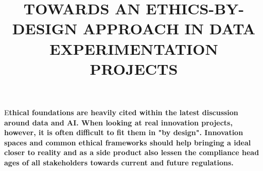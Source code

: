 \documentclass[	DIV=calc,%
							paper=a4,%
							fontsize=11pt,%
							twocolumn, draft]{scrartcl}	 					%
\title{TOWARDS AN ETHICS-BY-DESIGN APPROACH IN DATA EXPERIMENTATION PROJECTS}					%
\date{}																				%
\newcommand{\initial}[1]{%
     \lettrine[lines=3,lhang=0.3,nindent=0em]{
     				\color{DarkGoldenrod}
     				{\textsf{#1}}}{}}
\begin{document}
\maketitle
\initial{E}\textbf{thical foundations are heavily cited within the latest discussion around data and AI. When looking at real innovation projects, however, it is often difficult to fit them in "by design". Innovation spaces and common ethical frameworks should help bringing a ideal closer to reality and as a side product also lessen the compliance head ages of all stakeholders towards current and future regulations.}










\end{document}
